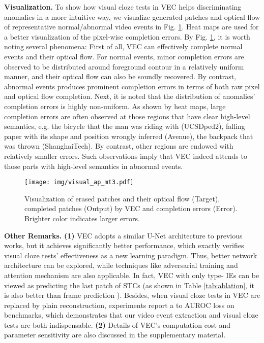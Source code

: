 \documentclass[sigconf]{acmart}
\begin{document}
\textbf{Visualization.} To show how visual cloze tests in VEC helps discriminating anomalies in a more intuitive way, we visualize generated patches and optical flow of representative normal/abnormal video events in Fig. \ref{fig:visual}. Heat maps are used for a better visualization of the pixel-wise completion errors. By Fig. \ref{fig:visual}, it is worth noting several phenomena: First of all, VEC can effectively complete normal events and their optical flow. For normal events, minor completion errors are observed to be distributed around foreground contour in a relatively uniform manner, and their optical flow can also be soundly recovered. By contrast, abnormal events produces prominent completion errors in terms of both raw pixel and optical flow completion. Next, it is noted that the distribution of anomalies' completion errors is highly non-uniform. As shown by heat maps, large completion errors are often observed at those regions that have clear high-level semantics, e.g. the bicycle that the man was riding with (UCSDped2), falling paper with its shape and position wrongly inferred (Avenue), the backpack that was thrown (ShanghaiTech). By contrast, other regions are endowed with relatively smaller errors. Such observations imply that VEC indeed attends to those parts with high-level semantics in abnormal events. 

\begin{figure}
	\centering
	\texttt{[image: img/visual\_ap\_mt3.pdf]}
	\caption{Visualization of erased patches and their optical flow (Target), completed patches (Output) by VEC and completion errors (Error). Brighter color indicates larger errors.}
	\label{fig:visual}
\end{figure}

\textbf{Other Remarks.} \textbf{(1)} VEC adopts a similar U-Net architecture to previous works, but it achieves significantly better performance, which exactly verifies visual cloze tests' effectiveness as a new learning paradigm. Thus, better network architecture can be explored, while techniques like adversarial training and attention mechanism are also applicable. In fact, VEC with only type- IEs can be viewed as predicting the last patch of STCs (as shown in Table \ref{tab:ablation}, it is also better than frame prediction \cite{liu2018future}). Besides, when visual cloze tests in VEC are replaced by plain reconstruction, experiments report a  to  AUROC loss on benchmarks, which demonstrates that our video event extraction and visual cloze tests are both indispensable. \textbf{(2)} Details of VEC's computation cost and parameter sensitivity are also discussed in the supplementary material.
\end{document}
